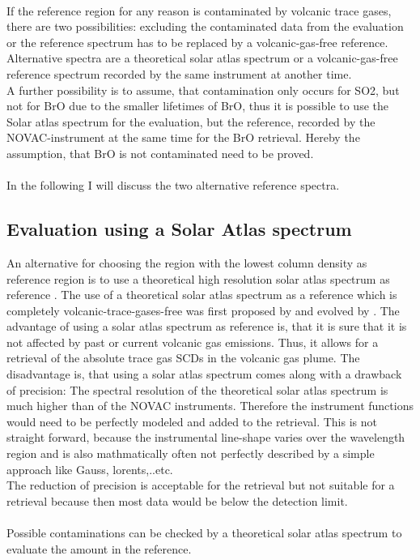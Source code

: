 \\
If the reference region for any reason is
contaminated by volcanic trace gases, there are two possibilities: excluding the contaminated data from the evaluation or the reference spectrum has to be
replaced by a volcanic-gas-free reference. Alternative spectra are a
theoretical solar atlas spectrum or a volcanic-gas-free reference
spectrum recorded by the same instrument at another time.\\
A further possibility is to assume, that contamination only occurs for SO2, but not for BrO due to the smaller lifetimes of BrO, thus it is possible to use the Solar atlas spectrum for the  evaluation, but the reference, recorded by the NOVAC-instrument at the same time for the BrO retrieval. Hereby the assumption, that BrO is not contaminated need to be proved. \\
%
\\
%
In the following I will discuss the two alternative reference spectra.
%
\subsection*{Evaluation using a Solar Atlas spectrum \label{kuruz}}
An alternative for choosing the region with the lowest column density as reference region is to use a theoretical high resolution solar atlas spectrum as reference \citep{chance2010improved}.
The use of a theoretical solar atlas spectrum as a reference which is completely volcanic-trace-gases-free was first proposed by \cite{salerno2009novel} and evolved by \citep{lubcke2014bro}.
The advantage of using a solar atlas spectrum as reference is, that it is sure that it is not affected by past or current volcanic gas emissions. Thus, it allows for a retrieval of the absolute trace gas SCDs in the volcanic gas plume. The disadvantage is, that using a solar atlas spectrum comes along with a drawback of precision: The spectral resolution of the theoretical solar atlas spectrum is much  higher than of the NOVAC instruments. Therefore the instrument functions would need to be perfectly modeled and added to the retrieval. This is not straight forward, because the instrumental line-shape varies over the wavelength region and is also mathmatically often not perfectly described by a simple approach like Gauss, lorents,..etc.\\ 
The reduction of precision is acceptable for the
 retrieval but not suitable for a  retrieval because then most data would be below the detection limit.\\
%
\\
%
Possible contaminations can be checked
by a theoretical solar atlas spectrum to evaluate the  amount in the reference.\\

